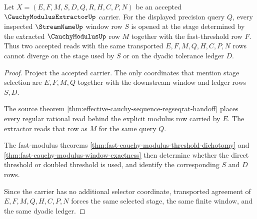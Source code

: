 \begin{theorem}\label{thm:cauchy-modulus-extractor-stage-determinacy}
Let $X=(E,F,M,S,D,Q,R,H,C,P,N)$ be an accepted $\CauchyModulusExtractorUp$ carrier. For the displayed precision query $Q$, every inspected $\StreamNameUp$ window row $S$ is opened at the stage determined by the extracted $\CauchyModulusUp$ row $M$ together with the fast-threshold row $F$. Thus two accepted reads with the same transported $E,F,M,Q,H,C,P,N$ rows cannot diverge on the stage used by $S$ or on the dyadic tolerance ledger $D$.
\end{theorem}
\begin{proof}
Project the accepted carrier. The only coordinates that mention stage selection are $E,F,M,Q$ together with the downstream window and ledger rows $S,D$.

The source theorem \autoref{thm:effective-cauchy-sequence-regseqrat-handoff} places every regular rational read behind the explicit modulus row carried by $E$. The extractor reads that row as $M$ for the same query $Q$.

The fast-modulus theorems \autoref{thm:fast-cauchy-modulus-threshold-dichotomy} and \autoref{thm:fast-cauchy-modulus-window-exactness} then determine whether the direct threshold or doubled threshold is used, and identify the corresponding $S$ and $D$ rows.

Since the carrier has no additional selector coordinate, transported agreement of $E,F,M,Q,H,C,P,N$ forces the same selected stage, the same finite window, and the same dyadic ledger.
\end{proof}

